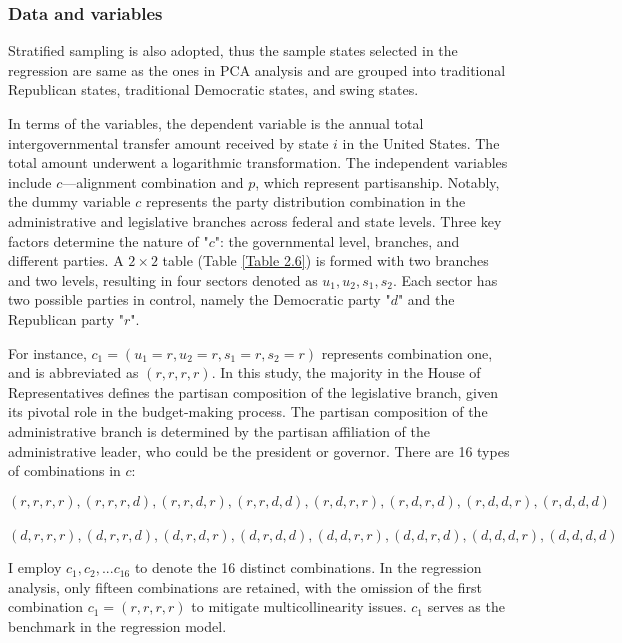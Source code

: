 \subsubsection{Data and variables}
Stratified sampling is also adopted, thus the sample states selected in the regression are same as the ones in PCA analysis and are grouped into traditional Republican states, traditional Democratic states, and swing states.

In terms of the variables, the dependent variable is the annual total intergovernmental transfer amount received by state $i$ in the United States. The total amount underwent a logarithmic transformation. The independent variables include $c$---alignment combination and $p$, which represent partisanship. Notably, the dummy variable $c$ represents the party distribution combination in the administrative and legislative branches across federal and state levels. Three key factors determine the nature of "$c$": the governmental level, branches, and different parties. A $2\times2$ table (Table \ref{Table 2.6}) is formed with two branches and two levels, resulting in four sectors denoted as $u_1, u_2, s_1, s_2$. Each sector has two possible parties in control, namely the Democratic party "$d$" and the Republican party "$r$".

For instance, $c_1 = (u_1 = r, u_2 = r, s_1 = r, s_2 = r)$ represents combination one, and is abbreviated as $(r, r, r, r)$. In this study, the majority in the House of Representatives defines the partisan composition of the legislative branch, given its pivotal role in the budget-making process. The partisan composition of the administrative branch is determined by the partisan affiliation of the administrative leader, who could be the president or governor. There are 16 types of combinations in $c$:

$$(r, r, r, r), (r, r, r, d), (r, r, d, r), (r, r, d, d), (r, d, r, r), (r, d, r, d), (r, d, d, r), (r, d, d, d)$$\\$$(d, r, r, r), (d, r, r, d), (d, r, d, r), (d, r, d, d), (d, d, r, r), (d, d, r, d), (d, d, d, r), (d, d, d, d) $$

I employ $c_1, c_2, . . . c_{16}$ to denote the 16 distinct combinations. In the regression analysis, only fifteen combinations are retained, with the omission of the first combination $c_1 = (r, r, r, r)$ to mitigate multicollinearity issues. $c_1$ serves as the benchmark in the regression model.


